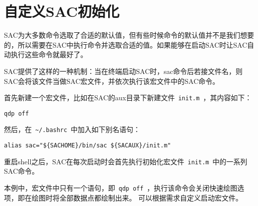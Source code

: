 \section{自定义SAC初始化}
SAC为大多数命令选取了合适的默认值，但有些时候命令的默认值并不是我们想要的，所以需要在SAC中执行命令并选取合适的值。如果能够在启动SAC时让SAC自动执行这些命令就最好了。

SAC提供了这样的一种机制：当在终端启动SAC时，sac命令后若接文件名，则SAC会将该文件当做SAC宏文件，并依次执行该宏文件中的SAC命令。

首先新建一个宏文件，比如在SAC的aux目录下新建文件~\lstinline{init.m}~，其内容如下：
\begin{lstlisting}[style=Shell]
qdp off
\end{lstlisting}

然后，在~\lstinline{~/.bashrc}~中加入如下别名语句：
\begin{lstlisting}[style=Shell]
alias sac="${SACHOME}/bin/sac ${SACAUX}/init.m"
\end{lstlisting}

重启shell之后，SAC在每次启动时会首先执行初始化宏文件~\lstinline{init.m}~中的一系列SAC命令。

本例中，宏文件中只有一个语句，即~\lstinline{qdp off}~，执行该命令会关闭快速绘图选项，即在绘图时将全部数据点都绘制出来。
可以根据需求自定义启动宏文件。
